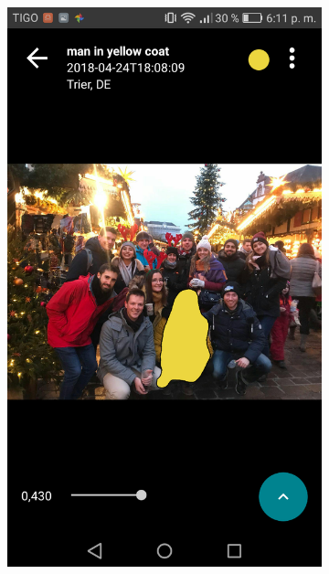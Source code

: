 \begin{figure}[!htbp]
\begin{multicols}{3}
    \begin{subfigure}[b]{\columnwidth}
            \centering
            \includegraphics[width=\textwidth]{./figures/dmn_app/views/13.png}
    \label{subfig:color_result}
    \end{subfigure}
    

\end{multicols}
\end{figure}
